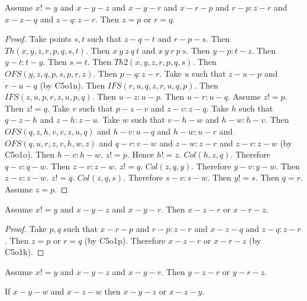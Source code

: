 \documentclass{article}
\begin{document}
  \begin{forthel}
    \begin{lemma}[C5o1p]
      Assume $x != y$ and $x-y-z$ and $x-y-r$ and $x-r-p$ and $r-p : z-r$ and $x-z-q$ and $z-q : z-r$. Then $z = p$ or $r = q$.
    \end{lemma}
    \begin{proof}
    	Take points $s,t$ such that $z-q-t$ and $r-p-s$.
    	Then $Th(x,y,z,r,p,q,s,t)$.
    	Then $x~y~z~q~t$ and $x~y~r~p~s$.
    	Then $y-p : t-z$.
    	Then $y-t : t-y$.
    	Then $s = t$.
    	Then $Th2(x,y,z,r,p,q,s)$.
    	Then $OFS(y,z,q,p,s,p,r,z)$.
    	Then $p-q : z-r$.
    	Take $u$ such that $z-u-p$ and $r-u-q$ (by C5o1n).
    	Then $IFS(r,u,q,z,r,u,q,p)$.
    	Then $IFS(z,u,p,r,z,u,p,q)$.
    	Then $u-z : u-p$.
    	Then $u-r : u-q$.
    	Assume $z != p$. Then $z != q$.
    		Take $v$ such that $p-z-v$ and $z-v : z-q$.
    		Take $h$ such that $q-z-h$ and $z-h : z-u$.
    		Take $w$ such that $v-h-w$ and $h-w : h-v$.
    		Then $OFS(q,z,h,v,v,z,u,q)$ and $h-v : u-q$ and $h-w : u-r$ and $OFS(q,u,r,z,v,h,w,z)$ and $q-r : v-w$ and $z-w : z-r$ and $z-v : z-w$ (by C5o1o).
    		Then $h-v : h-w$. $z != p$. Hence $h != z$. $Col(h,z,q)$. Therefore $q-v : q-w$.
    		Then $z-v : z-w$. $z != q$. $Col(z,q,y)$. Therefore $y-v : y-w$.
    		Then $z-v : z-w$. $z != q$. $Col(z,q,s)$. Therefore $s-v : s-w$.
    		Then $y != s$.
    		Then $q = r$.
    	Assume $z = p$.
    \end{proof}

    \begin{lemma}[D5o1]
      Assume $x != y$ and $x-y-z$ and $x-y-r$. Then $x-z-r$ or $x-r-z$.
    \end{lemma}
    \begin{proof}
    	Take $p,q$ such that $x-r-p$ and $r-p : z-r$ and $x-z-q$ and $z-q : z-r$. Then $z = p$ or $r = q$ (by C5o1p). Therefore $x-z-r$ or $x-r-z$ (by C5o1k).
    \end{proof}

    \begin{lemma}[D5o2]
      Assume $x != y$ and $x-y-z$ and $x-y-r$. Then $y-z-r$ or $y-r-z$.
    \end{lemma}

    \begin{theorem}[D5o3]
      If $x-y-w$ and $x-z-w$ then $x-y-z$ or $x-z-y$.
    \end{theorem}
  \end{forthel}
\end{document}
